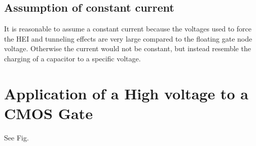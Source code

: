 \subsection{Assumption of constant current}
It is reasonable to assume a constant current because the voltages used to force the HEI and tunneling effects are very large compared to the
floating gate node voltage. Otherwise the current would not be constant, but instead resemble the charging of a capacitor to a specific voltage.

\section{Application of a High voltage to a CMOS Gate}
See Fig.


